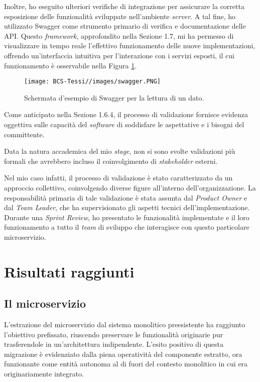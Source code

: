         \vspace{0.2 em}
        \noindent Inoltre, ho eseguito ulteriori verifiche di integrazione per assicurare la corretta esposizione delle funzionalità sviluppate nell'ambiente \textit{server}. A tal fine, ho utilizzato Swagger come strumento primario di verifica e documentazione delle API. Questo \textit{framework}, approfondito nella Sezione 1.7, mi ha permesso di visualizzare in tempo reale l'effettivo funzionamento delle nuove implementazioni, offrendo un'interfaccia intuitiva per l'interazione con i servizi esposti, il cui funzionamento è osservabile nella Figura \ref{fig:swagger}.
        
        \begin{figure}[H]
            \centering
            \texttt{[image: BCS-Tessi//images/swagger.PNG]}
            \caption{Schermata d'esempio di Swagger per la lettura di un dato.}
            \label{fig:swagger}
        \end{figure}

        \vspace{0.2 em}
        \noindent Come anticipato nella Sezione 1.6.4, il processo di validazione fornisce evidenza oggettiva sulle capacità del \textit{software} di soddisfare le aspettative e i bisogni del committente. 

        \vspace{0.2 em}
        \noindent Data la natura accademica del mio \textit{stage}, non si sono svolte validazioni più formali che avrebbero incluso il coinvolgimento di \textit{stakeholder} esterni.

        \vspace{0.2 em}
        \noindent Nel mio caso infatti, il processo di validazione è stato caratterizzato da un approccio collettivo, coinvolgendo diverse figure all'interno dell'organizzazione. La responsabilità primaria di tale validazione è stata assunta dal \textit{Product Owner} e dal \textit{Team Leader}, che ha supervisionato gli aspetti tecnici dell'implementazione. Durante una \textit{Sprint Review}, ho presentato le funzionalità implementate e il loro funzionamento a tutto il \textit{team} di sviluppo che interagisce con questo particolare microservizio.


    \section{Risultati raggiunti}
        \subsection{Il microservizio}
        L'estrazione del microservizio dal sistema monolitico preesistente ha raggiunto l'obiettivo prefissato, riuscendo preservare le funzionalità originarie pur trasferendole in un'architettura indipendente. L'esito positivo di questa migrazione è evidenziato dalla piena operatività del componente estratto, ora funzionante come entità autonoma al di fuori del contesto monolitico in cui era originariamente integrato.

